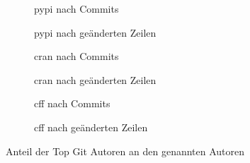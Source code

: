 \begin{figure}[H]
    \begin{subfigure}{.5\textwidth}
        \centering
        
        \caption{\gls{pypi} nach Commits}
        \label{fig:common_authors_pypi}
    \end{subfigure}%
    \begin{subfigure}{.5\textwidth}
        \centering
        
        \caption{\gls{pypi} nach geänderten Zeilen}
        \label{fig:common_authors_by_lines_pypi}
    \end{subfigure}
    \begin{subfigure}{.5\textwidth}
        \centering
        
        \caption{\gls{cran} nach Commits}
        \label{fig:common_authors_cran}
    \end{subfigure}%
    \begin{subfigure}{.5\textwidth}
        \centering
        
        \caption{\gls{cran} nach geänderten Zeilen}
        \label{fig:common_authors_by_lines_cran}
    \end{subfigure}
    \begin{subfigure}{.5\textwidth}
        \centering
        
        \caption{\gls{cff} nach Commits}
        \label{fig:common_authors_cff}
    \end{subfigure}%
    \begin{subfigure}{.5\textwidth}
        \centering
        
        \caption{\gls{cff} nach geänderten Zeilen}
        \label{fig:common_authors_by_lines_cff}
    \end{subfigure}
    \caption{Anteil der Top Git Autoren an den genannten Autoren}
    \label{fig:common_authors_anhang}
\end{figure}

